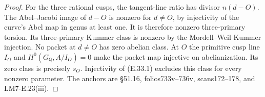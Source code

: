 \begin{proof}
For the three rational cusps, the
tangent-line ratio has divisor $n(d-O)$.
The Abel--Jacobi image of $d-O$ is nonzero
for $d\ne O$, by injectivity of the curve's
Abel map in genus at least one. It is
therefore nonzero three-primary torsion.
Its three-primary Kummer class is nonzero
by the Mordell--Weil Kummer injection.
No packet at $d\ne O$ has zero abelian
class. At $O$ the primitive cusp line $I_O$
and $H^0(G_{\mathbb Q},A/I_O)=0$ make the
packet map injective on abelianization.
Its zero class is precisely $s_O$.
Injectivity of (E.33.1) excludes this
class for every nonzero parameter.
The anchors are \S51.16, folios733v--736v,
scans172--178, and LM7-E.23(iii).
\end{proof}
